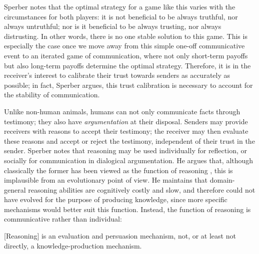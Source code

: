 Sperber notes that the optimal strategy for a game like this varies with the circumstances for both players: it is not beneficial to be always truthful, nor always untruthful; nor is it beneficial to be always trusting, nor always distrusting. In other words, there is no one stable solution to this game.
This is especially the case once we move away from this simple one-off communicative event to an iterated game of communication, where not only short-term payoffs but also long-term payoffs determine the optimal strategy.
Therefore, it is in the receiver's interest to calibrate their trust towards senders as accurately as possible; in fact, Sperber argues, this trust calibration is necessary to account for the stability of communication.

Unlike non-human animals, humans can not only communicate facts through testimony; they also have \emph{argumentation} at their disposal. Senders may provide receivers with reasons to accept their testimony; the receiver may then evaluate these reasons and accept or reject the testimony, independent of their trust in the sender.
Sperber notes that reasoning may be used individually for reflection, or socially for communication in dialogical argumentation. He argues that, although classically the former has been viewed as the function of reasoning \citep[cf.][]{Novaes20}, this is implausible from an evolutionary point of view. He maintains that domain-general reasoning abilities are cognitively costly and slow, and therefore could not have evolved for the purpose of producing knowledge, since more specific mechanisms would better suit this function. Instead, the function of reasoning is communicative rather than individual:
\begin{quoting}
    {[Reasoning]} is an evaluation and persuasion mechanism, not, or at least not directly, a knowledge-production mechanism.
    \hfill \citep[p.~409]{Sperber01}
\end{quoting}

